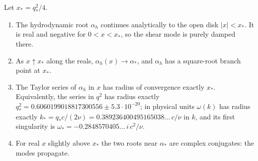 \begin{theorem}\label{thm:radius}
Let $x_*=q_*^2/4$.
\begin{enumerate}[label=(\alph*)]
\item The hydrodynamic root $\alpha_h$ continues analytically to the open disk $|x|<x_*$. It is real and negative for $0<x<x_*$, so the shear mode is purely damped there.
\item As $x\uparrow x_*$ along the reals, $\alpha_h(x)\to\alpha_*$, and $\alpha_h$ has a square-root branch point at $x_*$.
\item The Taylor series of $\alpha_h$ in $x$ has radius of convergence exactly $x_*$. Equivalently, the series in $q^2$ has radius exactly $q_*^2=0.6060199018817300556\pm5.3\cdot10^{-20}$; in physical units $\omega(k)$ has radius exactly $k_*=q_*c/(2\nu)=0.389236400495165038\ldots\,c/\nu$ in $k$, and its first singularity is $\omega_*=-0.2848570405\ldots\,i\,c^2/\nu$.
\item For real $x$ slightly above $x_*$ the two roots near $\alpha_*$ are complex conjugates: the modes propagate.
\end{enumerate}
\end{theorem}
